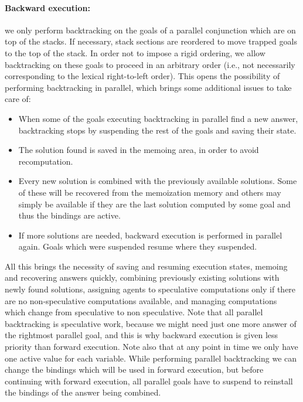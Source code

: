 \documentclass{tlp}
\begin{document}
\vspace{-0.5em}
\paragraph{Backward execution:}
we only perform backtracking on the goals of a parallel conjunction
which are on top of the stacks.  If necessary, stack sections are
reordered to move trapped goals to the top of the stack.  In order not
to impose a rigid ordering,
we allow backtracking on these goals to
proceed in an arbitrary order (i.e., not necessarily corresponding to
the lexical right-to-left order).  This opens the possibility of
performing backtracking in parallel, which brings some additional
issues to take care of:

\begin{itemize}
\item When some of the goals executing backtracking in parallel
find a new answer, backtracking stops by suspending the
  rest of the goals and saving their state.
\item The solution found is saved in the memoing area, in order to
  avoid recomputation.
\item Every new solution is combined with the previously available
  solutions. Some of these will be recovered from the memoization
  memory and others may simply be available if they are the last
  solution computed by some goal and thus the bindings are active.
\item If more solutions are needed, backward execution
is performed in parallel again. Goals which were suspended resume
  where they suspended.
\end{itemize}

All this brings the necessity of saving and resuming execution states,
memoing and recovering answers quickly, combining previously existing
solutions with newly found solutions, assigning agents to speculative
computations only if there are no non-speculative computations
available, and managing computations which change from speculative to
non speculative.
Note that all parallel backtracking is speculative work, because we
might need just one more answer of the rightmost parallel goal, and
this is why backward execution is given less priority than forward
execution.
Note also that at any point in time we only have one active value for
each variable. While performing parallel backtracking we can change
the bindings which will be used in forward execution, but before
continuing with forward execution, all parallel goals have to suspend
to reinstall the bindings of the answer being combined.
\end{document}
